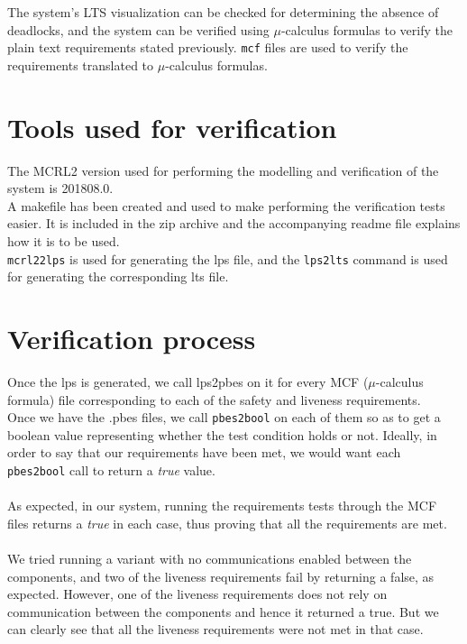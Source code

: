 The system's LTS visualization can be checked for determining the absence of deadlocks, and the system can be verified using $\mu$-calculus formulas to verify the plain text requirements stated previously. \texttt{mcf} files are used to verify the requirements translated to $\mu$-calculus formulas.

\section{Tools used for verification}

The MCRL2 version used for performing the modelling and verification of the system is 201808.0.\\

A makefile has been created and used to make performing the verification tests easier. It is included in the zip archive and the accompanying readme file explains how it is to be used.\\
\texttt{mcrl22lps} is used for generating the lps file, and the \texttt{lps2lts} command is used for generating the corresponding lts file.

\section{Verification process}
Once the lps is generated, we call lps2pbes on it for every MCF ($\mu$-calculus formula) file corresponding to each of the safety and liveness requirements.\\
Once we have the .pbes files, we call \texttt{pbes2bool} on each of them so as to get a boolean value representing whether the test condition holds or not. Ideally, in order to say that our requirements have been met, we would want each \texttt{pbes2bool} call to return a \textit{true} value.\\\\
As expected, in our system, running the requirements tests through the MCF files returns a \textit{true} in each case, thus proving that all the requirements are met.\\\\
We tried running a variant with no communications enabled between the components, and two of the liveness requirements fail by returning a false, as expected. However, one of the liveness requirements does not rely on communication between the components and hence it returned a true. But we can clearly see that all the liveness requirements were not met in that case.

